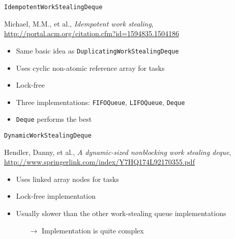 \begin{frame}{\lstinline!IdempotentWorkStealingDeque!}
  \begin{thebibliography}{10}
    \beamertemplatearticlebibitems
    
    Michael, M.M., et al., {\em Idempotent work stealing},
    \url{http://portal.acm.org/citation.cfm?id=1594835.1504186}
  \end{thebibliography}


  \begin{itemize}
  \item Same basic idea as \lstinline!DuplicatingWorkStealingDeque!
  \item Uses cyclic non-atomic reference array for tasks
  \item Lock-free
  \item Three implementations: \lstinline!FIFOQueue!,
    \lstinline!LIFOQueue!, \lstinline!Deque!
  \item \lstinline!Deque! performs the best
  \end{itemize}
\end{frame}

\begin{frame}{\lstinline!DynamicWorkStealingDeque!}
  \begin{thebibliography}{10}
    \beamertemplatearticlebibitems
    
    Hendler, Danny, et al., {\em A dynamic-sized nonblocking work stealing deque},
    \url{http://www.springerlink.com/index/Y7HQ174L92170355.pdf}
  \end{thebibliography}


  \begin{itemize}
  \item Uses linked array nodes for tasks
  \item Lock-free implementation
  \item Usually slower than the other work-stealing queue implementations
    \begin{itemize}
    \item[$\rightarrow$] Implementation is quite complex
    \end{itemize}
  \end{itemize}
\end{frame}

